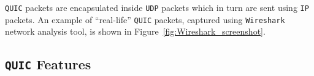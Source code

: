 \documentclass[12pt,a4paper]{report}
\newcommand\note[2]{{\color{#1}\bf #2}}
\newcommand\simon[1]{\ifcomments{\note{cyan}{SM: #1}}\fi}
\begin{document}
    


\texttt{QUIC} packets are encapsulated inside \texttt{UDP} packets which in turn are sent using \texttt{IP} packets.
An example of \enquote{real-life} \texttt{QUIC} packets, captured using \texttt{Wireshark} network analysis tool, is shown in Figure~\ref{fig:Wireshark_screenshot}.






\subsection{\texttt{QUIC} Features} \label{QUIC_features}

 
\end{document}
